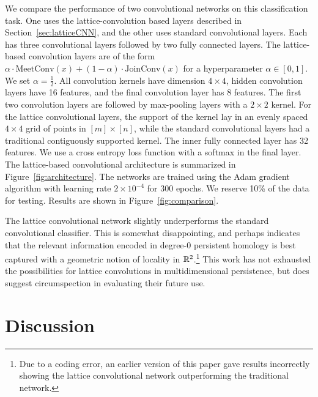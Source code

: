\documentclass{article}
\begin{document}
We compare the performance of two convolutional networks on this classification
task. One uses the lattice-convolution based layers described in
Section~\ref{sec:latticeCNN}, and the other uses standard convolutional layers.
Each has three convolutional layers followed by two fully connected layers.
The lattice-based convolution layers are of the form $\alpha \cdot \text{MeetConv}(x) +
(1-\alpha)\cdot\text{JoinConv}(x)$ for a hyperparameter $\alpha \in [0,1]$. We
set $\alpha = \frac{1}{2}$. All
convolution kernels have dimension $4 \times 4$, hidden convolution layers have
16 features, and the final convolution layer has 8 features. The first two convolution
layers are followed by max-pooling layers with a $2 \times 2$ kernel. For the
lattice convolutional layers, the support of the kernel lay in an evenly spaced
$4 \times 4$ grid of points in $[m]\times [n]$, while the standard convolutional
layers had a traditional contiguously supported kernel.
The inner fully connected layer has 32 features. We use a cross entropy loss
function with a softmax in the final layer. The lattice-based convolutional architecture
is summarized in Figure~\ref{fig:architecture}.
The networks are trained using the
Adam gradient algorithm with learning rate $2 \times 10^{-4}$ for 300 epochs. We reserve
10\% of the data for testing. Results are shown in Figure~\ref{fig:comparison}.


The lattice convolutional network slightly underperforms the standard
convolutional classifier. This is somewhat disappointing, and perhaps indicates
that the relevant information encoded in degree-0 persistent homology is best
captured with a geometric notion of locality in $\mathbb{R}^2$.\footnote{Due to a coding
  error, an earlier version of this paper gave results incorrectly showing the
  lattice convolutional network outperforming the traditional network.} This
work has not exhausted the possibilities for lattice convolutions in
multidimensional persistence, but does suggest circumspection in evaluating
their future use.

\section{Discussion}
\end{document}
